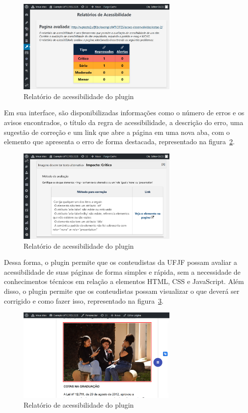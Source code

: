 \documentclass[
    12pt,
    a4paper,
    oneside,
    brazil,
    english
]{article}
\begin{document}
\begin{figure}[ht]
    \centering
    \caption{Relatório de acessibilidade do plugin}
    \label{fig:relatorio}
    \includegraphics[width=0.7\textwidth]{imagem2.png}
\end{figure}


Em sua interface, são disponibilizadas informações
como o número de erros e os avisos encontrados,
o título da regra de acessibilidade, a descrição do erro, uma sugestão de correção
e um link que abre a página em uma nova aba, com o elemento que apresenta o erro de
forma destacada, representado na figura~\ref{fig:relatorio2}.

\begin{figure}[h]
    \centering
    \caption{Relatório de acessibilidade do plugin}
    \label{fig:relatorio2}
    \includegraphics[width=0.7\textwidth]{imagem3.png}
\end{figure}

Dessa forma, o plugin permite que os conteudistas da UFJF possam avaliar a
acessibilidade de suas páginas de forma simples e rápida, sem a necessidade
de conhecimentos técnicos em relação a elementos HTML, CSS e JavaScript.
Além disso, o plugin permite que os conteudistas possam visualizar o que
deverá ser corrigido e como fazer isso, representado na figura~\ref{fig:relatorio3}.

\begin{figure}[h]
    \centering
    \caption{Relatório de acessibilidade do plugin}
    \label{fig:relatorio3}
    \includegraphics[width=0.7\textwidth]{imagem4.png}
\end{figure}
\end{document}

